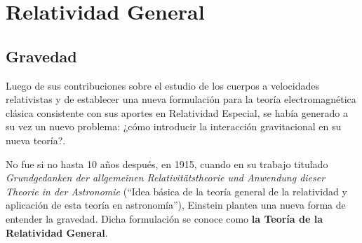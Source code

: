 \chapter{Relatividad General}
\label{cap:2}
\newpage

\section{Gravedad}

Luego de sus contribuciones sobre el estudio de los cuerpos a velocidades relativistas y de establecer una nueva formulación para la teoría electromagnética clásica consistente con sus aportes en Relatividad Especial, se había generado a su vez un nuevo problema: ¿cómo introducir la interacción gravitacional en su nueva teoría?.

No fue si no hasta 10 años después, en 1915, cuando en su trabajo titulado \textit{Grundgedanken der allgemeinen Relativitätstheorie und Anwendung dieser Theorie in der Astronomie} \cite{Einstein-2} (``Idea básica de la teoría general de la relatividad y aplicación de esta teoría en astronomía''), Einstein plantea una nueva forma de entender la gravedad. Dicha formulación se conoce como \textbf{la Teoría de la Relatividad General}. 

